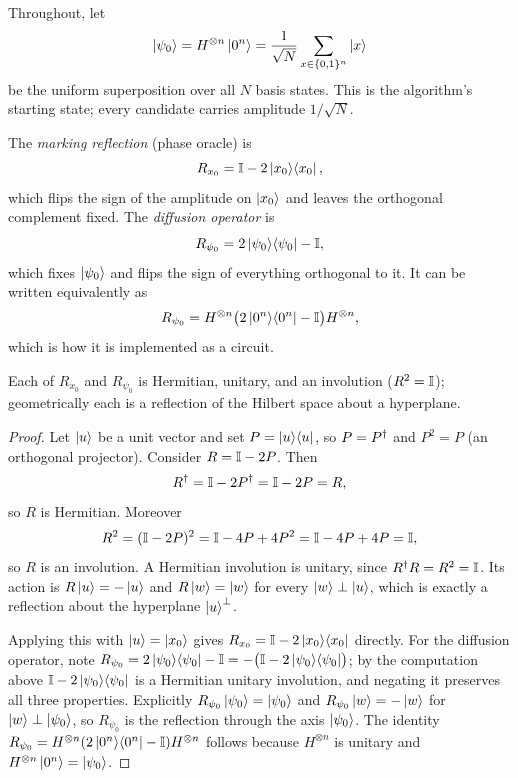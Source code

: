 Throughout, let
\[
  \ket{\psi_0}=H^{\otimes n}\ket{0^{n}}=\frac{1}{\sqrt N}\sum_{x\in\{0,1\}^{n}}\ket{x}
\]
be the uniform superposition over all $N$ basis states. This is the algorithm's
starting state; every candidate carries amplitude $1/\sqrt N$.

\begin{definition}
\label{def:lec03-reflections}
The \emph{marking reflection} (phase oracle) is
\[
  R_{x_0}=\mathbb{I}-2\ket{x_0}\!\bra{x_0},
\]
which flips the sign of the amplitude on $\ket{x_0}$ and leaves the orthogonal
complement fixed. The \emph{diffusion operator} is
\[
  R_{\psi_0}=2\ket{\psi_0}\!\bra{\psi_0}-\mathbb{I},
\]
which fixes $\ket{\psi_0}$ and flips the sign of everything orthogonal to it. It
can be written equivalently as
\[
  R_{\psi_0}=H^{\otimes n}\bigl(2\ket{0^{n}}\!\bra{0^{n}}-\mathbb{I}\bigr)H^{\otimes n},
\]
which is how it is implemented as a circuit.
\end{definition}

\begin{lemma}
\label{lem:lec03-reflections}
Each of $R_{x_0}$ and $R_{\psi_0}$ is Hermitian, unitary, and an involution
($R^2=\mathbb{I}$); geometrically each is a reflection of the Hilbert space about a
hyperplane.
\end{lemma}

\begin{proof}
Let $\ket{u}$ be a unit vector and set $P=\ket{u}\!\bra{u}$, so $P=P^{\dagger}$ and $P^{2}=P$ (an
orthogonal projector). Consider $R=\mathbb{I}-2P$. Then
\[
  R^{\dagger}=\mathbb{I}-2P^{\dagger}=\mathbb{I}-2P=R,
\]
so $R$ is Hermitian. Moreover
\[
  R^{2}=(\mathbb{I}-2P)^{2}=\mathbb{I}-4P+4P^{2}=\mathbb{I}-4P+4P=\mathbb{I},
\]
so $R$ is an involution. A Hermitian involution is unitary, since
$R^{\dagger} R=R^{2}=\mathbb{I}$. Its action is $R\ket{u}=-\ket{u}$ and $R\ket{w}=\ket{w}$ for
every $\ket{w}\perp\ket{u}$, which is exactly a reflection about the hyperplane
$\ket{u}^{\perp}$.

Applying this with $\ket{u}=\ket{x_0}$ gives $R_{x_0}=\mathbb{I}-2\ket{x_0}\!\bra{x_0}$ directly.
For the diffusion operator, note
$R_{\psi_0}=2\ket{\psi_0}\!\bra{\psi_0}-\mathbb{I}=-\bigl(\mathbb{I}-2\ket{\psi_0}\!\bra{\psi_0}\bigr)$; by the computation
above $\mathbb{I}-2\ket{\psi_0}\!\bra{\psi_0}$ is a Hermitian unitary involution, and negating it
preserves all three properties. Explicitly $R_{\psi_0}\ket{\psi_0}=\ket{\psi_0}$
and $R_{\psi_0}\ket{w}=-\ket{w}$ for $\ket{w}\perp\ket{\psi_0}$, so $R_{\psi_0}$ is
the reflection through the axis $\ket{\psi_0}$. The identity
$R_{\psi_0}=H^{\otimes n}(2\ket{0^{n}}\!\bra{0^{n}}-\mathbb{I})H^{\otimes n}$ follows because
$H^{\otimes n}$ is unitary and $H^{\otimes n}\ket{0^{n}}=\ket{\psi_0}$.
\end{proof}

